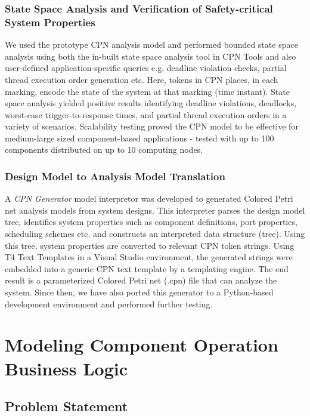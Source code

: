 \subsubsection{State Space Analysis and Verification of Safety-critical System Properties}
We used the prototype CPN analysis model and performed bounded state space analysis using both the in-built state space analysis tool in CPN Tools \cite{CPNTools} and also user-defined application-specific queries e.g. deadline violation checks, partial thread execution order generation etc. Here, tokens in CPN places, in each marking, encode the state of the system at that marking (time instant). State space analysis yielded positive results \cite{kumar2014colored} identifying deadline violations, deadlocks, worst-case trigger-to-response times, and partial thread execution orders in a variety of scenarios. Scalability testing proved the CPN model to be effective for medium-large sized component-based applications - tested with up to 100 components distributed on up to 10 computing nodes. 


\subsubsection{Design Model to Analysis Model Translation}
A \emph{CPN Generator} model interpretor \cite{kumar2014colored} was developed to generated Colored Petri net analysis models from system designs. This interpreter parses the design model tree, identifies system properties such as component definitions, port properties, scheduling schemes etc. and constructs an interpreted data structure (tree). Using this tree, system properties are converted to relevant CPN token strings. Using T4 Text Templates \cite{T4TextTemplates} in a Visual Studio environment, the generated strings were embedded into a generic CPN text template by a templating engine. The end result is a parameterized Colored Petri net (.cpn) file that can analyze the system. Since then, we have also ported this generator to a Python-based development environment \cite{kumarROSMOD} and performed further testing.

\newpage
\section{Modeling Component Operation Business Logic}
\label{sec:BL_Model}

\subsection{Problem Statement}

